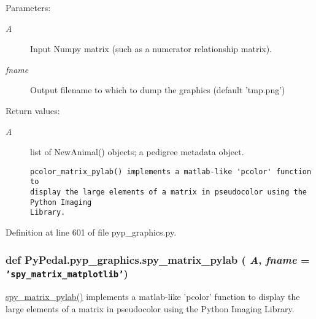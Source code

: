 \begin{Desc}
\item[Parameters:]
\begin{description}
\item[{\em A}]Input Numpy matrix (such as a numerator relationship matrix). \item[{\em fname}]Output filename to which to dump the graphics (default 'tmp.png') \end{description}
\end{Desc}
\begin{Desc}
\item[Return values:]
\begin{description}
\item[{\em A}]list of New\-Animal() objects; a pedigree metadata object.

\footnotesize\begin{verbatim}pcolor_matrix_pylab() implements a matlab-like 'pcolor' function to
display the large elements of a matrix in pseudocolor using the Python Imaging
Library.
\end{verbatim}
\normalsize
 \end{description}
\end{Desc}


Definition at line 601 of file pyp\_\-graphics.py.\hypertarget{namespacePyPedal_1_1pyp__graphics_9ac93feea0e4389e3d1e08798fe5e105}{
\subsubsection[spy\_\-matrix\_\-pylab]{\setlength{\rightskip}{0pt plus 5cm}def Py\-Pedal.pyp\_\-graphics.spy\_\-matrix\_\-pylab ( {\em A},  {\em fname} = {\tt 'spy\_\-matrix\_\-matplotlib'})}}
\label{namespacePyPedal_1_1pyp__graphics_9ac93feea0e4389e3d1e08798fe5e105}


\hyperlink{namespacePyPedal_1_1pyp__graphics_9ac93feea0e4389e3d1e08798fe5e105}{spy\_\-matrix\_\-pylab()} implements a matlab-like 'pcolor' function to display the large elements of a matrix in pseudocolor using the Python Imaging Library. 

